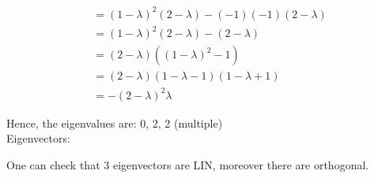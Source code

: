 \documentclass[]{article}
\begin{document}
\begin{align}
     &=(1-\lambda)^2(2-\lambda)-(-1)(-1)(2-\lambda) \\
     &= (1-\lambda)^2(2-\lambda)-(2-\lambda)\\
     &=(2-\lambda)((1-\lambda)^2-1) \\
     &=(2-\lambda)(1-\lambda -1)(1-\lambda +1)\\
     &=-(2-\lambda)^2\lambda
\end{align}

Hence, the eigenvalues are: 0, 2, 2 (multiple)\\

Eigenvectors:

\hspace{2cm}


\hspace{2cm}


One can check that 3 eigenvectors are LIN, moreover there are
orthogonal.
\end{document}
